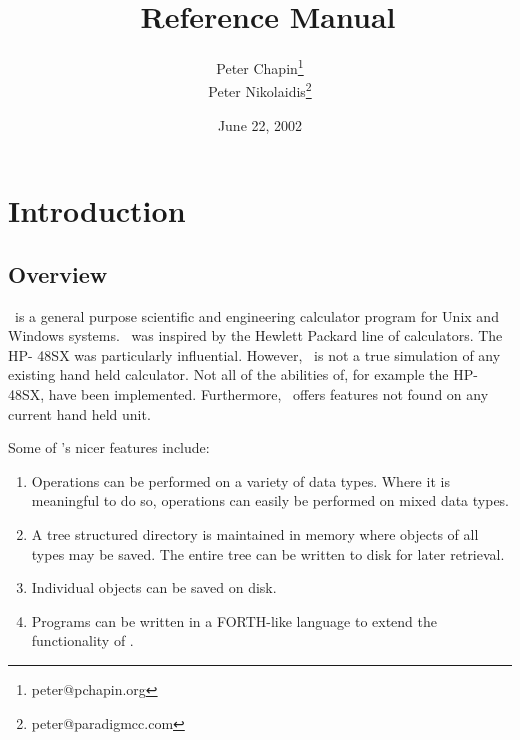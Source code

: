 \documentclass{report}
\begin{document}
\title{\CLAC\ Reference Manual}
\author{Peter Chapin\thanks{peter@pchapin.org}\\
        Peter Nikolaidis\thanks{peter@paradigmcc.com}}
\date{June 22, 2002}
\maketitle

\tableofcontents
\newpage
{}

\chapter{Introduction}

\section{Overview}

\CLAC\ is a general purpose scientific and engineering calculator program for Unix and Windows
systems. \CLAC\ was inspired by the Hewlett Packard line of calculators. The HP- 48SX was
particularly influential. However, \CLAC\ is not a true simulation of any existing hand held
calculator. Not all of the abilities of, for example the HP-48SX, have been implemented.
Furthermore, \CLAC\ offers features not found on any current hand held unit.

Some of \CLAC's nicer features include:

\begin{enumerate}
  
\item Operations can be performed on a variety of data types. Where it is meaningful to do so,
  operations can easily be performed on mixed data types.
  
\item A tree structured directory is maintained in memory where objects of all types may be
  saved. The entire tree can be written to disk for later retrieval.

\item Individual objects can be saved on disk.
  
\item Programs can be written in a FORTH-like language to extend the functionality of \CLAC.

\end{enumerate}
\end{document}
